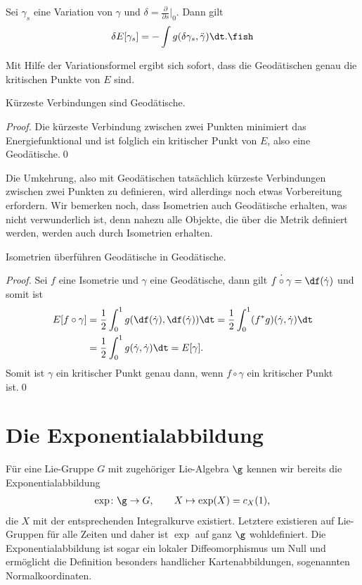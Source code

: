 \documentclass[%
	paper=a5,%
	fleqn,%
	DIV=18,%
	BCOR=0mm,
	fontsize=11pt,
	titlepage=false,%
	bibliography=totoc,
	DIV=18,%
	twoside=true,
	pdftitle=Riemannsche Geometrie,
	pdfauthor=Uwe Semmelmann,
	numbers=noendperiod]%
	{scrbook}
\begin{document}
\begin{prop}[Variationsformel]
Sei $\gamma_{s}$ eine Variation von $\gamma$ und $\delta = \frac{\partial}{\partial s}\big|_{0}$. Dann gilt
\begin{align*}
\delta E[\gamma_{s}] = -\int g(\delta \gamma_{s},\ddot\gamma)\dt.\fish
\end{align*}
\end{prop}

Mit Hilfe der Variationsformel ergibt sich sofort, dass die Geodätischen genau die kritischen Punkte von $E$ sind.

\begin{cor}
Kürzeste Verbindungen sind Geodätische.\fish
\end{cor}
\begin{proof}
Die kürzeste Verbindung zwischen zwei Punkten minimiert das Energiefunktional und ist folglich ein kritischer Punkt von $E$, also eine Geodätische.\qed
\end{proof}

Die Umkehrung, also mit Geodätischen tatsächlich kürzeste Verbindungen zwischen zwei Punkten zu definieren, wird allerdings noch etwas Vorbereitung erfordern. Wir bemerken noch, dass Isometrien auch Geodätische erhalten, was nicht verwunderlich ist, denn nahezu alle Objekte, die über die Metrik definiert werden, werden auch durch Isometrien erhalten.

\begin{cor}
Isometrien überführen Geodätische in Geodätische.\fish
\end{cor}
\begin{proof}
Sei $f$ eine Isometrie und $\gamma$ eine Geodätische, dann gilt $\dot{f\circ \gamma} = \df(\dot{\gamma})$ und somit ist
\begin{align*}
E[f\circ \gamma] &= \frac{1}{2}\int_{0}^1 g(\df(\dot\gamma),\df(\dot\gamma))\dt
= \frac{1}{2}\int_{0}^1 (f^*g)(\dot\gamma,\dot\gamma)\dt\\
&= \frac{1}{2}\int_{0}^1 g(\dot\gamma,\dot\gamma)\dt
= E[\gamma].
\end{align*}
Somit ist $\gamma$ ein kritischer Punkt genau dann, wenn $f\circ\gamma$ ein kritischer Punkt ist.\qed
\end{proof}


\section{Die Exponentialabbildung}

Für eine Lie-Gruppe $G$ mit zugehöriger Lie-Algebra $\g$ kennen wir bereits die
Exponentialabbildung
\begin{align*}
\exp\colon \g \to G,\qquad X\mapsto \exp(X) = c_X(1),
\end{align*}
die $X$ mit der entsprechenden Integralkurve existiert. Letztere existieren auf Lie-Gruppen für
alle Zeiten und daher ist $\exp$ auf ganz $\g$ wohldefiniert. Die Exponentialabbildung ist
sogar ein lokaler Diffeomorphismus um Null und ermöglicht die Definition
besonders handlicher Kartenabbildungen, sogenannten Normalkoordinaten.
\end{document}
